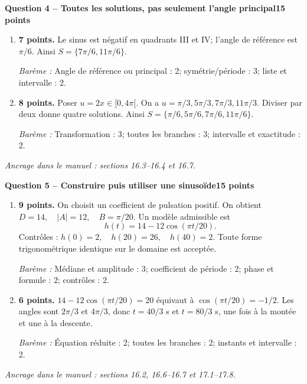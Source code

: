 \documentclass[11pt,a4paper]{article}
\begin{document}
\newpage
{\large\bfseries Question 4 -- Toutes les solutions, pas seulement l’angle principal}\hfill\textbf{15 points}\par
\begin{enumerate}
\item \textbf{7 points.} Le sinus est négatif en quadrants III et IV; l’angle de référence est \(\pi/6\). Ainsi \(S=\{7\pi/6,11\pi/6\}\).
\par{\small\textit{Barème : }Angle de référence ou principal : 2; symétrie/période : 3; liste et intervalle : 2.}
\item \textbf{8 points.} Poser \(u=2x\in[0,4\pi[\). On a \(u=\pi/3,5\pi/3,7\pi/3,11\pi/3\). Diviser par deux donne quatre solutions. Ainsi \(S=\{\pi/6,5\pi/6,7\pi/6,11\pi/6\}\).
\par{\small\textit{Barème : }Transformation : 3; toutes les branches : 3; intervalle et exactitude : 2.}
\end{enumerate}
\vfill {\small\textit{Ancrage dans le manuel : sections 16.3--16.4 et 16.7.}}

\newpage
{\large\bfseries Question 5 -- Construire puis utiliser une sinusoïde}\hfill\textbf{15 points}\par
\begin{enumerate}
\item \textbf{9 points.} On choisit un coefficient de pulsation positif. On obtient \(D=14,\quad |A|=12,\quad B=\pi/20\). Un modèle admissible est \[h(t)=14-12\cos(\pi t/20).\] Contrôles : \(h(0)=2,\quad h(20)=26,\quad h(40)=2\). Toute forme trigonométrique identique sur le domaine est acceptée.
\par{\small\textit{Barème : }Médiane et amplitude : 3; coefficient de période : 2; phase et formule : 2; contrôles : 2.}
\item \textbf{6 points.} \(14-12\cos(\pi t/20)=20\) équivaut à \(\cos(\pi t/20)=-1/2\). Les angles sont \(2\pi/3\) et \(4\pi/3\), donc \(t=40/3\) s et \(t=80/3\) s, une fois à la montée et une à la descente.
\par{\small\textit{Barème : }Équation réduite : 2; toutes les branches : 2; instants et intervalle : 2.}
\end{enumerate}
\vfill {\small\textit{Ancrage dans le manuel : sections 16.2, 16.6--16.7 et 17.1--17.8.}}
\end{document}
